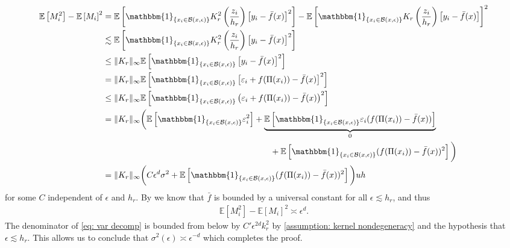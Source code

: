\documentclass[11pt]{article}
\begin{document}
\begin{align*}
    \mathbb{E}\left[M_i^2\right] - \mathbb{E}\left[M_i\right]^2 &= \mathbb{E}\left[\mathbbm{1}_{\{x_i \in \mathcal{B}(x, \epsilon)\}}K_r^2\left(\frac{z_i}{h_r}\right)\left[y_i - \bar{f}(x)\right]^2\right] - \mathbb{E}\left[\mathbbm{1}_{\{x_i \in \mathcal{B}(x, \epsilon)\}}K_r\left(\frac{z_i}{h_r}\right)\left[y_i - \bar{f}(x)\right]\right]^2 \\
    &\lesssim  \mathbb{E}\left[\mathbbm{1}_{\{x_i \in \mathcal{B}(x, \epsilon)\}}K_r^2\left(\frac{z_i}{h_r}\right)\left[y_i - \bar{f}(x)\right]^2\right] \\
    &\leq \|K_r\|_{\infty}\mathbb{E}\left[\mathbbm{1}_{\{x_i \in \mathcal{B}(x, \epsilon)\}}\left[y_i - \bar{f}(x)\right]^2\right] \\
    &= \|K_r\|_{\infty}\mathbb{E}\left[\mathbbm{1}_{\{x_i \in \mathcal{B}(x, \epsilon)\}}\left[\varepsilon_i + f(\Pi(x_i)) - \bar{f}(x)\right]^2\right] \\
    &\leq \|K_r\|_{\infty}\mathbb{E}\left[\mathbbm{1}_{\{x_i \in \mathcal{B}(x, \epsilon)\}}\left(\varepsilon_i + f(\Pi(x_i)) - \bar{f}(x)\right)^2\right] \\ 
    &= \|K_r\|_{\infty}\bigg(\mathbb{E}\left[\mathbbm{1}_{\{x_i \in \mathcal{B}(x, \epsilon)\}}\varepsilon_i^2 \right] + \underbrace{\mathbb{E}\left[\mathbbm{1}_{\{x_i \in \mathcal{B}(x, \epsilon)\}}\varepsilon_i(f(\Pi(x_i)) - \bar{f}(x)) \right]}_{0}\\
    & \hspace{70mm}+ \mathbb{E}\left[\mathbbm{1}_{\{x_i \in \mathcal{B}(x, \epsilon)\}}(f(\Pi(x_i)) - \bar{f}(x))^2 \right]\bigg) \\
    &= \|K_r\|_{\infty}\bigg(C\epsilon^d\sigma^2+ \mathbb{E}\left[\mathbbm{1}_{\{x_i \in \mathcal{B}(x, \epsilon)\}}(f(\Pi(x_i)) - \bar{f}(x))^2 \right]\bigg)
 uh\end{align*}
for some $C$ independent of $\epsilon$ and $h_r$. By  we know that $\bar{f}$ is bounded by a universal constant for all $\epsilon \lesssim h_r$, and thus
\begin{align}
    \mathbb{E}\left[M_i^2\right] - \mathbb{E}\left[M_i\right]^2 \asymp \epsilon^d.
\end{align}
The denominator of \cref{eq: var decomp} is bounded from below by $C'\epsilon^{2d}k_r^2$ by \cref{assumption: kernel nondegeneracy} and the hypothesis that $\epsilon \lesssim h_r$. This allows us to conclude that $\sigma^{2}(\epsilon) \asymp \epsilon^{-d}$ which completes the proof.
\end{document}
